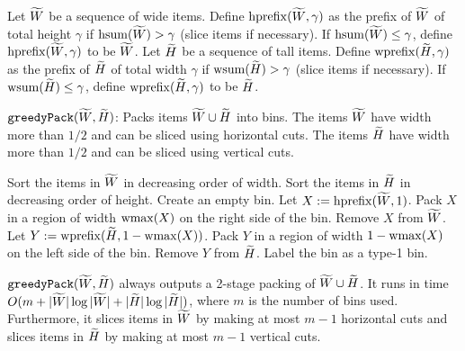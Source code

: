 \begin{definition}
\label{defn:hw-prefix}
Let $\widetilde{W}$ be a sequence of wide items.
Define $\operatorname{hprefix}(\widetilde{W}, \gamma)$ as the prefix of $\widetilde{W}$ of total height $\gamma$
if $\operatorname{hsum}(\widetilde{W}) > \gamma$ (slice items if necessary).
If $\operatorname{hsum}(\widetilde{W}) \le \gamma$, define $\operatorname{hprefix}(\widetilde{W}, \gamma)$ to be $\widetilde{W}$.
Let $\widetilde{H}$ be a sequence of tall items.
Define $\operatorname{wprefix}(\widetilde{H}, \gamma)$ as the prefix of $\widetilde{H}$ of total width $\gamma$
if $\operatorname{wsum}(\widetilde{H}) > \gamma$ (slice items if necessary).
If $\operatorname{wsum}(\widetilde{H}) \le \gamma$, define $\operatorname{wprefix}(\widetilde{H}, \gamma)$ to be $\widetilde{H}$.
\end{definition}

\begin{algorithm}[!ht]
\caption{$\operatorname{\mathtt{greedyPack}}(\widetilde{W}, \widetilde{H})$: Packs items $\widetilde{W} \cup \widetilde{H}$ into bins.
The items $\widetilde{W}$ have width more than $1/2$ and can be sliced using horizontal cuts.
The items $\widetilde{H}$ have width more than $1/2$ and can be sliced using vertical cuts.}
\label{algo:greedyPack}
\begin{algorithmic}[1]
\State Sort the items in $\widetilde{W}$ in decreasing order of width.
\State Sort the items in $\widetilde{H}$ in decreasing order of height.
    \State Create an empty bin.
    \If{$\hsum(\Wtild) \ge \wsum(\Htild)$}
        \State Let $X := \operatorname{hprefix}(\widetilde{W}, 1)$. 
        \State Pack $X$ in a region of width $\operatorname{wmax}(X)$ on the right side of the bin.
        \State Remove $X$ from $\widetilde{W}$.
        \State Let $Y := \operatorname{wprefix}(\widetilde{H}, 1-\operatorname{wmax}(X))$. 
        \State Pack $Y$ in a region of width $1 - \operatorname{wmax}(X)$ on the left side of the bin.
        \State Remove $Y$ from $\widetilde{H}$.
        \State Label the bin as a type-1 bin.
    \Else
    \EndIf
\EndWhile
\end{algorithmic}
\end{algorithm}

\begin{claim}
\label{thm:greedy-pack}
$\operatorname{\mathtt{greedyPack}}(\widetilde{W}, \widetilde{H})$ always outputs a 2-stage packing of $\widetilde{W} \cup \widetilde{H}$.
It runs in time $O(m + |\widetilde{W}|\log|\widetilde{W}| + |\widetilde{H}|\log|\widetilde{H}|)$,
where $m$ is the number of bins used.
Furthermore, it slices items in $\widetilde{W}$ by making at most $m-1$ horizontal cuts
and slices items in $\widetilde{H}$ by making at most $m-1$ vertical cuts.
\end{claim}

